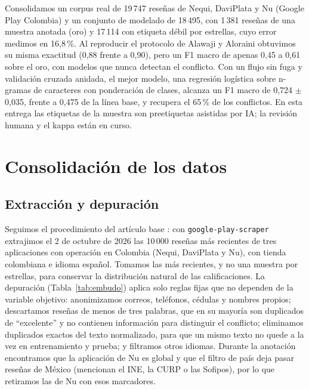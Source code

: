 \documentclass[11pt,a4paper]{article}
\newif\ifborrador
\begin{document}
\begin{tcolorbox}[colback=verde!6,colframe=verde,title=\textbf{Resumen de la entrega},fonttitle=\small,fontupper=\small]
Consolidamos un corpus real de 19\,747 reseñas de Nequi, DaviPlata y Nu (Google Play Colombia) y
un conjunto de modelado de 18\,495, con 1\,381 reseñas de una muestra anotada (oro) y 17\,114 con
etiqueta débil por estrellas, cuyo error medimos en 16,8\,\%. Al reproducir el protocolo de Alawaji y
Aloraini obtuvimos su misma exactitud (0,88 frente a 0,90), pero un F1 macro de apenas 0,45 a 0,61
sobre el oro, con modelos que nunca detectan el conflicto. Con un flujo sin fuga y validación cruzada
anidada, el mejor modelo, una regresión logística sobre n-gramas de caracteres con ponderación de
clases, alcanza un F1 macro de 0,724 $\pm$ 0,035, frente a 0,475 de la línea base, y recupera el
65\,\% de los conflictos. \ifborrador Las etiquetas de la muestra son preetiquetas asistidas por IA
revisadas por el equipo, con un kappa de Cohen de 0,63 entre los dos anotadores.\else En esta
entrega las etiquetas de la muestra son preetiquetas asistidas por IA; la revisión humana y el
kappa están en curso.\fi
\end{tcolorbox}

\section{Consolidación de los datos}

\subsection{Extracción y depuración}
Seguimos el procedimiento del artículo base \cite{alawaji}: con \texttt{google-play-scraper}
extrajimos el 2 de octubre de 2026 las 10\,000 reseñas más recientes de tres aplicaciones con
operación en Colombia (Nequi, DaviPlata y Nu), con tienda colombiana e idioma español. Tomamos
las más recientes, y no una muestra por estrellas, para conservar la distribución natural de las
calificaciones. La depuración (Tabla~\ref{tab:embudo}) aplica solo reglas fijas que no dependen
de la variable objetivo: anonimizamos correos, teléfonos, cédulas y nombres propios; descartamos
reseñas de menos de tres palabras, que en su mayoría son duplicados de ``excelente'' y no
contienen información para distinguir el conflicto; eliminamos duplicados exactos del texto
normalizado, para que un mismo texto no quede a la vez en entrenamiento y prueba; y filtramos
otros idiomas. Durante la anotación encontramos que la aplicación de Nu es global y que el filtro
de país deja pasar reseñas de México (mencionan el INE, la CURP o las Sofipos), por lo que
retiramos las de Nu con esos marcadores.
\end{document}
